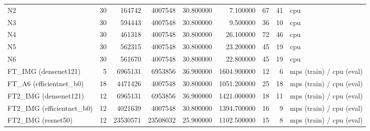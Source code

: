 \begin{table}
\begin{tabular}{lrrrrrrrl}
N2 & 30 & 164742 & 4007548 & 30.800000 & 7.100000 & 67 & 41 & cpu \\
N3 & 30 & 594443 & 4007548 & 30.800000 & 9.500000 & 36 & 10 & cpu \\
N4 & 30 & 461318 & 4007548 & 30.800000 & 26.100000 & 72 & 46 & cpu \\
N5 & 30 & 562315 & 4007548 & 30.800000 & 23.200000 & 45 & 19 & cpu \\
N6 & 30 & 561670 & 4007548 & 30.800000 & 22.800000 & 45 & 19 & cpu \\
FT\_IMG (densenet121) & 5 & 6965131 & 6953856 & 36.900000 & 1604.900000 & 12 & 6 & mps (train) / cpu (eval) \\
FT\_A6 (efficientnet\_b0) & 18 & 4471426 & 4007548 & 30.800000 & 1051.200000 & 25 & 18 & mps (train) / cpu (eval) \\
FT2\_IMG (densenet121) & 12 & 6965131 & 6953856 & 36.900000 & 1421.000000 & 18 & 11 & mps (train) / cpu (eval) \\
FT2\_IMG (efficientnet\_b0) & 12 & 4021639 & 4007548 & 30.800000 & 1394.700000 & 16 & 9 & mps (train) / cpu (eval) \\
FT2\_IMG (resnet50) & 12 & 23530571 & 23508032 & 25.900000 & 1102.500000 & 15 & 8 & mps (train) / cpu (eval) \\
\bottomrule
\end{tabular}
\end{table}
